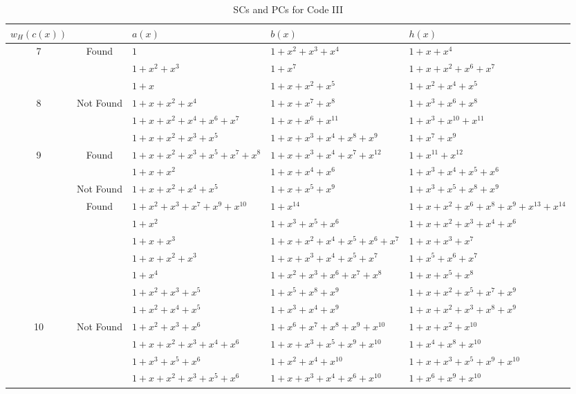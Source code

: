 	\begin{table}[htbp]
		\caption{SCs and PCs for Code III}
		\centering
		\begin{tabularx}{0.48\textwidth}{|c|c|XXX} 
			\toprule
			$w_H(c(x))$&~& $a(x)$ & $b(x)$ & $h(x)$ \\ %
			\midrule
			7&Found&$1$ & $1+x^2+x^3+x^4$ & $1+x+x^{4}$\\
			  &~&$1+x^2+x^3$ & $1+x^7$ & $1+x+x^2+x^6+x^7$\\
			\cline{1-5}
			&&$1+x$ 						& $1+x+x^2+x^5$ 			& $1+x^2+x^4+x^5$\\
			8&Not Found&$1+x+x^2+x^4$ 				& $1+x+x^7+x^8$ 			& $1+x^3+x^6+x^8$\\
			&&$1+x+x^2+x^4+x^6+x^7$ 	& $1+x+x^6+x^{11}$ 			& $1+x^3+x^{10}+x^{11}$\\
			\cline{1-5}
			&~&$1+x+x^2+x^3+x^5$ & $1+x+x^3+x^4+x^8+x^9$ & $1+x^7+x^9$\\
			9&Found&$1+x+x^2+x^3+x^5+x^7+x^8$ & $1+x+x^3+x^4+x^7+x^{12}$ & $1+x^{11}+x^{12}$\\
			\cline{2-5}
			 ~&~&$1+x+x^2$ 					& $1+x+x^4+x^6$ 			& $1+x^{3}+x^{4}+x^5+x^6$\\
			&Not Found&$1+x+x^2+x^4+x^5$ 		& $1+x+x^5+x^9$ 			& $1+x^{3}+x^{5}+x^8+x^9$\\
			\cline{1-5}
			&Found&$1+x^2+x^3+x^7+x^9+x^{10}$ & $1+x^{14}$ & $1+x+x^2+x^6+x^8+x^9+x^{13}+x^{14}$\\
						\cline{2-5}
			&&$1+x^2$ 								& $1+x^3+x^5+x^6$ 					& $1+x+x^2+x^{3}+x^{4}+x^6$\\
			&&$1+x+x^3$ 								& $1+x+x^2+x^4+x^5+x^6+x^7$ 	& $1+x+x^{3}+x^{7}$\\
			&&$1+x+x^2+x^3$ 				& $1+x+x^3+x^4+x^5+x^7$ 			& $1+x^{5}+x^6+x^7$\\
			&&$1+x^4$ 								& $1+x^2+x^3+x^6+x^7+x^8$ 		& $1+x+x^{5}+x^8$\\
			&&$1+x^2+x^3+x^5$ 						& $1+x^5+x^8+x^9$ 					& $1+x+x^{2}+x^5+x^7+x^9$\\
			&~&$1+x^2+x^4+x^5$ 						& $1+x^3+x^4+x^9$ 					& $1+x+x^{2}+x^3+x^8+x^9$\\
			10&Not Found&$1+x^2+x^3+x^6$ 						& $1+x^6+x^7+x^8+x^9+x^{10}$ 	& $1+x+x^2+x^{10}$\\
			&&$1+x+x^2+x^3+x^4+x^6$ 				& $1+x+x^3+x^5+x^9+x^{10}$ 		& $1+x^4+x^8+x^{10}$\\
			&&$1+x^3+x^5+x^6$ 						& $1+x^2+x^4+x^{10}$ 				& $1+x+x^{3}+x^{5}+x^9+x^{10}$\\
			&&$1+x+x^2+x^3+x^5+x^6$ 				& $1+x+x^3+x^4+x^6+x^{10}$ 		& $1+x^{6}+x^{9}+x^{10}$\\

\end{tabularx}
\end{table}
